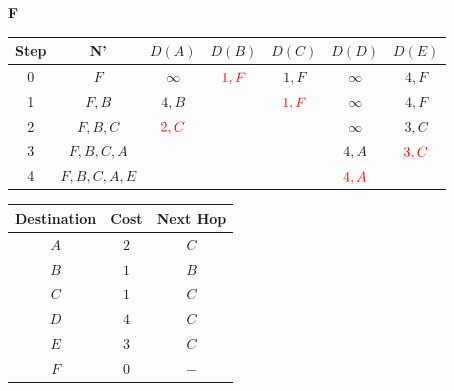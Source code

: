 \documentclass[10pt]{article}
\begin{document}
	\begin{center}
	 	\textbf{F}
 		\begin{tabular}{||c c c c c c c||} 
 			\hline
 			Step & N' & $D(A)$ & $D(B)$ & $D(C)$ & $D(D)$ & $D(E)$ \\[0.5ex] 
 			\hline\hline
 			0 & $F$ & $\infty$ & $\color{red} 1,F$ & $1,F$ & $\infty$ & $4,F$ \\
 			\hline
 			1 & $F,B$ & $4,B$ & & $\color{red} 1,F$ & $\infty$ & $4,F$ \\
 			\hline
 			2 & $F,B,C$& $\color{red} 2,C$ & & & $\infty$ & $3,C$ \\
 			\hline
 			3 & $F,B,C,A$ & & & & $4,A$ & $\color{red} 3,C$ \\
 			\hline
 			4 & $F,B,C,A,E$ & & & & $\color{red} 4,A$ & \\[0.5ex]  
 			\hline
		\end{tabular}
		\quad
		\begin{tabular}{||c || c || c||}
			\hline
 			Destination & Cost & Next Hop\\[0.5ex] 
 			\hline\hline
			$A$ & $2$ & $C$\\
			$B$ & $1$ & $B$\\
 			$C$ & $1$ & $C$\\
			$D$ & $4$ & $C$\\
			$E$ & $3$ & $C$\\
			$F$ & $0$ & $-$\\[0.5ex]
			\hline
		\end{tabular}
	\end{center}
\end{document}
